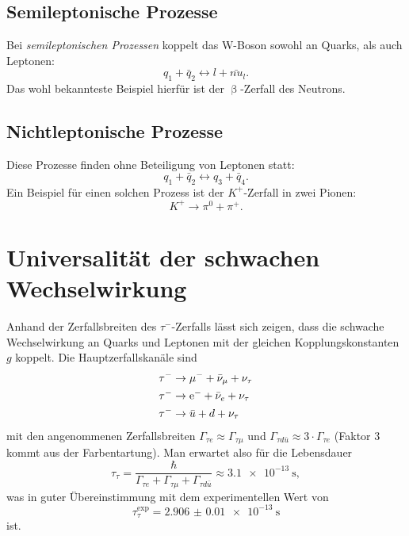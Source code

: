 \subsection{Semileptonische Prozesse}
Bei \textit{semileptonischen Prozessen} koppelt das W-Boson sowohl an Quarks, als auch Leptonen:
\begin{equation*}
	q_1 + \bar{q}_2 \longleftrightarrow l + \bar{nu}_l.
\end{equation*}
Das wohl bekannteste Beispiel hierfür ist der $\upbeta$-Zerfall des Neutrons.

\subsection{Nichtleptonische Prozesse}
Diese Prozesse finden ohne Beteiligung von Leptonen statt:
\begin{equation*}
	q_1 + \bar{q}_2 \longleftrightarrow q_3 + \bar{q}_4.
\end{equation*}
Ein Beispiel für einen solchen Prozess ist der $K^+$-Zerfall in zwei Pionen:
\begin{equation*}
	K^+ \rightarrow \pi^0 + \pi^+.
\end{equation*}

\section{Universalität der schwachen Wechselwirkung}
Anhand der Zerfallsbreiten des $\tau^-$-Zerfalls lässt sich zeigen, dass die schwache Wechselwirkung an Quarks und Leptonen mit der gleichen Kopplungskonstanten $g$ koppelt.
Die Hauptzerfallskanäle sind
\begin{align*}
	\tau^- &\rightarrow \mu^- + \bar{\nu}_\mu + \nu_\tau \\
	\tau^- &\rightarrow \text{e}^- + \bar{\nu}_e + \nu_\tau \\
	\tau^- &\rightarrow \bar{u} + d + \nu_\tau
\end{align*}
mit den angenommenen Zerfallsbreiten $\Gamma_{\tau e} \approx\Gamma_{\tau \mu}$ und $\Gamma_{\tau d\bar{u}}\approx 3\cdot\Gamma_{\tau e}$ (Faktor 3 kommt aus der Farbentartung).
Man erwartet also für die Lebensdauer
\begin{equation*}
	\tau_\tau = \frac{\hbar}{\Gamma_{\tau e} + \Gamma_{\tau \mu} + \Gamma_{\tau d\bar{u}}} \approx \SI{3.1e-13}{\second},
\end{equation*}
was in guter Übereinstimmung mit dem experimentellen Wert von
\begin{equation*}
	\tau_\tau^\text{exp} = \SI{2.906(10)e-13}{\second}
\end{equation*}
ist.

